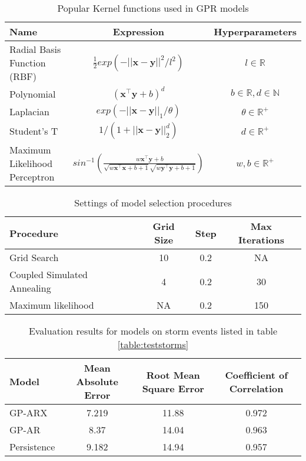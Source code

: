     \begin{table}[h]
    \caption{Popular Kernel functions used in GPR models}
    \centering
    \begin{tabular}{l c c}
    \hline
     Name  & Expression & Hyperparameters  \\
    \hline
      Radial Basis Function (RBF)  & $\frac{1}{2} exp(-||\mathbf{x} - \mathbf{y}||^2/l^2)$  & $l \in \mathbb{R}$   \\
      
      Polynomial  & $(\mathbf{x}^\intercal \mathbf{y} + b)^d$ & $b \in \mathbb{R}, d \in \mathbb{N}$   \\
      
      Laplacian  & $exp(-||\mathbf{x} - \mathbf{y}||_{1}/\theta)$  & $\theta \in \mathbb{R}^+$  \\
      
      Student's T  & $1/(1 + ||\mathbf{x} - \mathbf{y}||_{2}^d)$ & $d \in \mathbb{R}^{+}$\\
      
      Maximum Likelihood Perceptron  & $sin^{-1}(\frac{w\mathbf{x}^\intercal \mathbf{y} + b}{\sqrt{w\mathbf{x}^\intercal \mathbf{x} + b + 1} \sqrt{w\mathbf{y}^\intercal \mathbf{y} + b + 1}})$ & $w, b \in \mathbb{R}^{+}$\\
    \hline
    \end{tabular}
    \label{table:kernel}
    \end{table}
    
    \begin{table}[h]
    \centering
    \caption{Settings of model selection procedures}
    \begin{tabular}{l c c c}
    \hline
    Procedure & Grid Size & Step & Max Iterations \\
    \hline
    Grid Search & 10 & 0.2 & NA \\
    Coupled Simulated Annealing & 4 & 0.2 & 30 \\
    Maximum likelihood & NA & 0.2 & 150\\
    \end{tabular}
    \label{table:modelselection}
    \end{table}
    
    
    \begin{table}[h]
    \centering
    \caption{Evaluation results for models on storm events listed in table \ref{table:teststorms}}
    \label{table:results}
    \begin{tabular}{l c c c}
    \hline
    Model & Mean Absolute Error & Root Mean Square Error & Coefficient of Correlation\\ \hline
    GP-ARX & 7.219 & 11.88 & 0.972\\
    GP-AR & 8.37 & 14.04 & 0.963\\
    Persistence & 9.182 & 14.94 & 0.957\\
    \end{tabular}
    \end{table}
    
